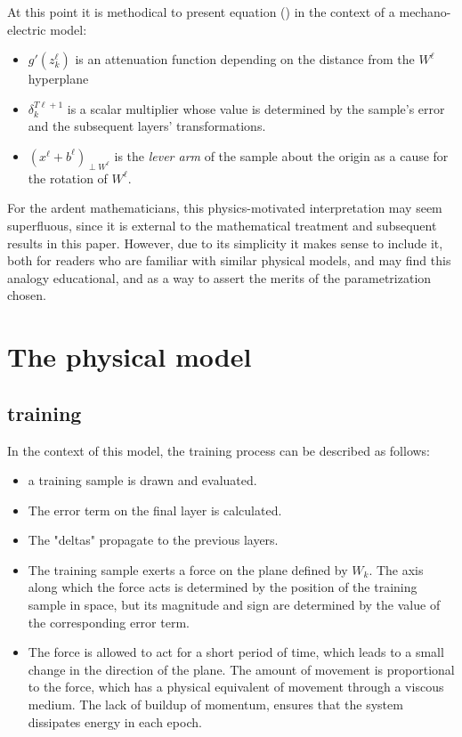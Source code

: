 \documentclass[]{article}
\begin{document}
	  	At this point it is methodical to present equation () in the context of a mechano-electric model: 
	  	\begin{itemize}
	  		\item $g'(z^{\ell}_k)$ is an attenuation function depending on the distance from the $W^\ell$ hyperplane
	  		\item  $\delta^{T\ell+1}_k$ is a scalar multiplier whose value is determined by the sample's error and the subsequent layers' transformations.
	  		\item $(x^{\ell}+b^{\ell})_{\perp W^\ell}$ is the \textit{lever arm} of the sample about the origin as a cause for the rotation of $W^\ell$.
	  	\end{itemize}
		
		For the ardent mathematicians, this physics-motivated interpretation may seem superfluous, since it is external to the mathematical treatment and subsequent results in this paper. However, due to its simplicity it makes sense to include it, both for readers who are familiar with similar physical models, and may find this analogy educational, and as a way to assert the merits of the parametrization chosen.
		 
	\section{The physical model}
	\subsection{training}
		In the context of this model, the training process can be described as follows:
		\begin{itemize}
			\item a training sample is drawn and evaluated.
			\item The error term on the final layer is calculated.
			\item The "deltas" propagate to the previous layers.
			\item The training sample exerts a force on the plane defined by $W_k$. The axis along which the force acts is determined by the position of the training sample in space, but its magnitude and sign are determined by the value of the corresponding error term.
			\item The force is allowed to act for a short period of time, which leads to a small change in the direction of the plane. The amount of movement is proportional to the force, which has a physical equivalent of movement through a viscous medium. The lack of buildup of momentum, ensures that the system dissipates energy in each epoch.
		\end{itemize}
  	
 		 
 
\end{document}
